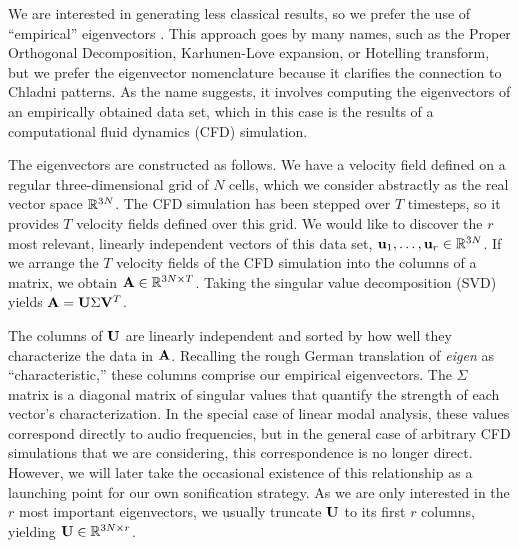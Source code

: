 \documentclass[11pt]{article}
\begin{document}

We are interested in generating less classical results, so we prefer the use of ``empirical'' eigenvectors \cite{Ryckelynck2005}. This approach goes by many names, such as the Proper Orthogonal Decomposition, Karhunen-Love expansion, or Hotelling transform, but we prefer the eigenvector nomenclature because it clarifies the connection to Chladni patterns. As the name suggests, it involves computing the eigenvectors of an empirically obtained data set, which in this case is the results of a computational fluid dynamics (CFD) simulation.

The eigenvectors are constructed as follows. We have a velocity field defined on a regular three-dimensional grid of $N$ cells, which we consider abstractly as the real vector space $\mathbb{R}^{3N}$. The CFD simulation has been stepped over $T$ timesteps, so it provides $T$ velocity fields defined over this grid. We would like to discover the $r$ most relevant, linearly independent vectors of this data set, $\mathbf{u}_1, \ldots, \mathbf{u}_r \in \mathbb{R}^{3N}$. If we arrange the $T$ velocity fields of the CFD simulation into the columns of a matrix, we obtain $\mathbf{A} \in \mathbb{R}^{3N \times T}$. Taking the singular value decomposition (SVD) yields $\mathbf{A} = \mathbf{U} \Sigma \mathbf{V}^T$.

The columns of $\mathbf{U}$ are linearly independent and sorted by how well they characterize the data in $\mathbf{A}$. Recalling the rough German translation of {\em eigen} as ``characteristic,'' these columns comprise our empirical eigenvectors. The $\Sigma$ matrix is a diagonal matrix of singular values that quantify the strength of each vector's characterization. In the special case of linear modal analysis, these values correspond directly to audio frequencies, but in the general case of arbitrary CFD simulations that we are considering, this correspondence is no longer direct. However, we will later take the occasional existence of this relationship as a launching point for our own sonification strategy. As we are only interested in the $r$ most important eigenvectors, we usually truncate $\mathbf{U}$ to its first $r$ columns, yielding $\mathbf{U} \in \mathbb{R}^{3N \times r}$.
\end{document}

